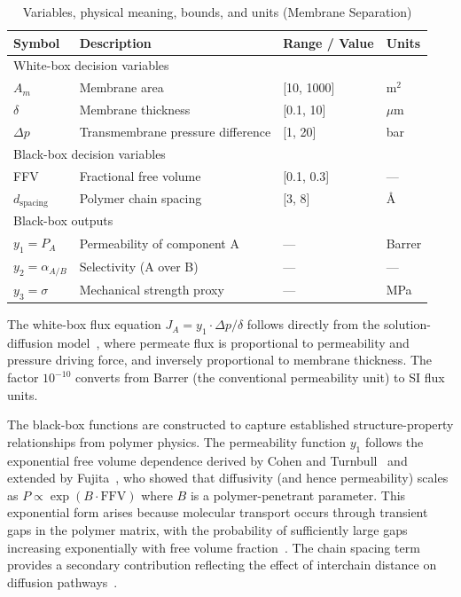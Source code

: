 \documentclass[12pt,a4paper]{article}%
\theoremstyle{plain}%
\theoremstyle{remark}%
\theoremstyle{definition}%
\providecommand{\DIFaddend}{} %
\DeclareRobustCommand{\DIFaddend}{\DIFOaddend \let\includegraphics\DIFOincludegraphics} %
\begin{document}
\begin{appendices}
{}

\DIFaddend \begin{table}[htbp]
\centering
\caption{Variables, physical meaning, bounds, and units (Membrane Separation)}
\label{tab:membrane_vars}
\begin{tabular}{@{}llll@{}}
\toprule
\textbf{Symbol} & \textbf{Description} & \textbf{Range / Value} & \textbf{Units} \\
\midrule
\multicolumn{4}{l}{White-box decision variables} \\
\midrule
$A_m$ & Membrane area & [10, 1000] & m$^2$ \\
$\delta$ & Membrane thickness & [0.1, 10] & $\mu$m \\
$\Delta p$ & Transmembrane pressure difference & [1, 20] & bar \\
\midrule
\multicolumn{4}{l}{Black-box decision variables} \\
\midrule
FFV & Fractional free volume & [0.1, 0.3] & --- \\
$d_{\text{spacing}}$ & Polymer chain spacing & [3, 8] & \AA \\
\midrule
\multicolumn{4}{l}{Black-box outputs} \\
\midrule
$y_1 = P_A$ & Permeability of component A & --- & Barrer \\
$y_2 = \alpha_{A/B}$ & Selectivity (A over B) & --- & --- \\
$y_3 = \sigma$ & Mechanical strength proxy & --- & MPa \\
\bottomrule
\end{tabular}
\end{table}

The white-box flux equation $J_A = y_1 \cdot \Delta p / \delta$ follows directly from the solution-diffusion model~\cite{wijmans1995solution}, where permeate flux is proportional to permeability and pressure driving force, and inversely proportional to membrane thickness. The factor $10^{-10}$ converts from Barrer (the conventional permeability unit) to SI flux units.

The black-box functions are constructed to capture established structure-property relationships from polymer physics. The permeability function $y_1$ follows the exponential free volume dependence derived by Cohen and Turnbull~\cite{cohen1959molecular} and extended by Fujita~\cite{fujita1961diffusion}, who showed that diffusivity (and hence permeability) scales as $P \propto \exp(B \cdot \text{FFV})$ where $B$ is a polymer-penetrant parameter. This exponential form arises because molecular transport occurs through transient gaps in the polymer matrix, with the probability of sufficiently large gaps increasing exponentially with free volume fraction~\cite{matteucci2006transport}. The chain spacing term provides a secondary contribution reflecting the effect of interchain distance on diffusion pathways~\cite{lee1980selection}.


\end{appendices}
\end{document}
